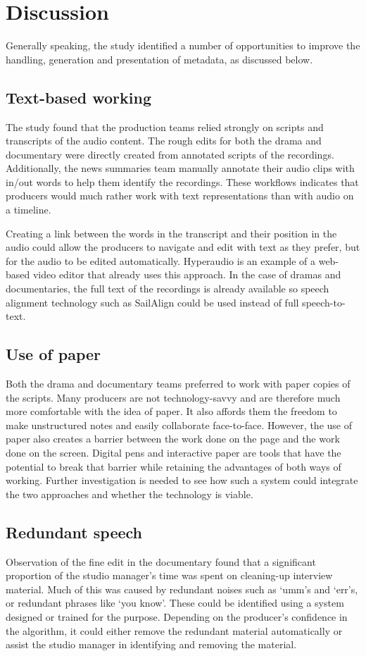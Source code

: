 \section{Discussion}\label{sec:ethno-discussion}
Generally speaking, the study identified a number of opportunities to improve the handling, generation and presentation
of metadata, as discussed below.

\subsection{Text-based working}
The study found that the production teams relied strongly on scripts and transcripts of the audio content. The rough
edits for both the drama and documentary were directly created from annotated scripts of the recordings.  Additionally,
the news summaries team manually annotate their audio clips with in/out words to help them identify the recordings.
These workflows indicates that producers would much rather work with text representations than with audio on a
timeline.

Creating a link between the words in the transcript and their position in the audio could allow the producers to
navigate and edit with text as they prefer, but for the audio to be edited automatically. Hyperaudio \citep{Boas2011}
is an example of a web-based video editor that already uses this approach. In the case of dramas and documentaries, the
full text of the recordings is already available so speech alignment technology such as SailAlign
\citep{Katsamanis2011} could be used instead of full speech-to-text.

\subsection{Use of paper}
Both the drama and documentary teams preferred to work with paper copies of the scripts. Many producers are not
technology-savvy and are therefore much more comfortable with the idea of paper. It also affords them the freedom to
make unstructured notes and easily collaborate face-to-face. However, the use of paper also creates a barrier between
the work done on the page and the work done on the screen. Digital pens and interactive paper are tools that have the
potential to break that barrier while retaining the advantages of both ways of working. Further investigation is needed
to see how such a system could integrate the two approaches and whether the technology is viable.

\subsection{Redundant speech}
Observation of the fine edit in the documentary found that a significant proportion of the studio manager's time was
spent on cleaning-up interview material. Much of this was caused by redundant noises such as `umm's and `err's, or
redundant phrases like `you know'. These could be identified using a system designed or trained for the purpose.
Depending on the producer's confidence in the algorithm, it could either remove the redundant material automatically or
assist the studio manager in identifying and removing the material. 

